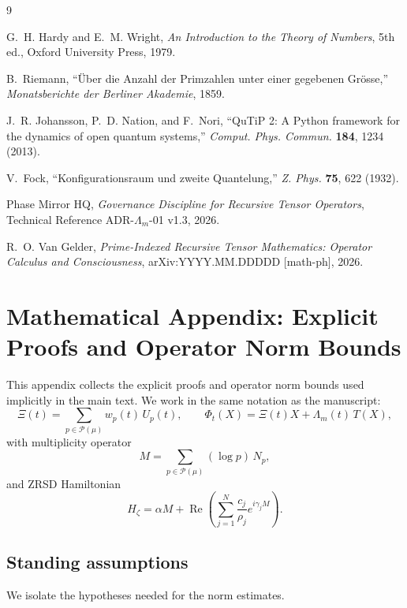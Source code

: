 \documentclass[11pt,a4paper]{article}
\theoremstyle{plain}
\theoremstyle{definition}
\theoremstyle{remark}
\begin{document}
\begin{thebibliography}{9}

G.~H. Hardy and E.~M. Wright, \textit{An Introduction to the Theory of Numbers}, 5th ed., Oxford University Press, 1979.

B.~Riemann, ``\"Uber die Anzahl der Primzahlen unter einer gegebenen Gr\"osse,'' \textit{Monatsberichte der Berliner Akademie}, 1859.

J.~R. Johansson, P.~D. Nation, and F.~Nori, ``QuTiP 2: A Python framework for the dynamics of open quantum systems,'' \textit{Comput. Phys. Commun.} \textbf{184}, 1234 (2013).

V.~Fock, ``Konfigurationsraum und zweite Quantelung,'' \textit{Z. Phys.} \textbf{75}, 622 (1932).

Phase Mirror HQ, \textit{Governance Discipline for Recursive Tensor Operators}, Technical Reference ADR-\(\Lambda_m\)-01 v1.3, 2026.

R.~O. Van Gelder, \textit{Prime-Indexed Recursive Tensor Mathematics: Operator Calculus and Consciousness}, arXiv:YYYY.MM.DDDDD [math-ph], 2026.

\end{thebibliography}

\appendix

\section{Mathematical Appendix: Explicit Proofs and Operator Norm Bounds}
\label{app:explicit_bounds}

This appendix collects the explicit proofs and operator norm bounds used implicitly in the main text.  We work in the same notation as the manuscript:
\[
\Xi(t)=\sum_{p\in \mathcal P(\mu)} w_p(t)\,U_p(t), 
\qquad
\Phi_t(X)=\Xi(t)X+\Lambda_m(t)\,T(X),
\]
with multiplicity operator
\[
M=\sum_{p\in \mathcal P(\mu)} (\log p)\,N_p,
\]
and ZRSD Hamiltonian
\[
H_\zeta
=
\alpha M
+
\operatorname{Re}\!\left(
\sum_{j=1}^N \frac{c_j}{\rho_j} e^{i\gamma_j M}
\right).
\]

\subsection{Standing assumptions}

We isolate the hypotheses needed for the norm estimates.
\end{document}
